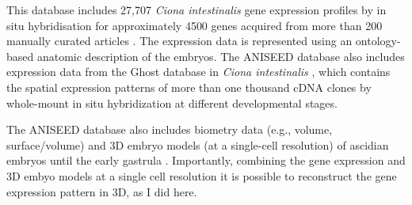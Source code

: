 This database includes 27,707 \textit{Ciona intestinalis} gene expression profiles by in situ hybridisation for approximately 4500 genes acquired from more than 200 manually curated articles \citep{Brozovic2016}.
%
The expression data is represented using an ontology-based anatomic description of the embryos. The ANISEED database also includes expression data from the Ghost database in \textit{Ciona intestinalis} \citep{Satou2005}, which contains the spatial expression patterns of more than one thousand cDNA clones by whole-mount in situ hybridization at different developmental stages.

The ANISEED database also includes biometry data (e.g., volume, surface/volume) and 3D embryo models (at a single-cell resolution) of ascidian embryos until the early gastrula \citep{Tassy2006}. Importantly, combining the gene expression and 3D embyo models at a single cell resolution it is possible to reconstruct the gene expression pattern in 3D, as I did here. 


